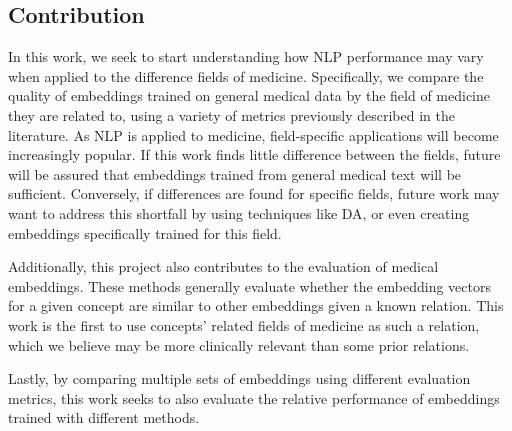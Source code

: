 \documentclass[10pt]{article}
\begin{document}
\subsection{Contribution}



In this work, we seek to start understanding how NLP performance may vary when applied to the difference fields of medicine. Specifically, we compare the quality of embeddings trained on general medical data by the field of medicine they are related to, using a variety of metrics previously described in the literature. As NLP is applied to medicine, field-specific applications will become increasingly popular. If this work finds little difference between the fields, future will be assured that embeddings trained from general medical text will be sufficient. Conversely, if differences are found for specific fields, future work may want to address this shortfall by using techniques like DA, or even creating embeddings specifically trained for this field. 

Additionally, this project also contributes to the evaluation of medical embeddings. These methods generally evaluate whether the embedding vectors for a given concept are similar to other embeddings given a known relation. This work is the first to use concepts' related fields of medicine as such a relation, which we believe may be more clinically relevant than some prior relations. 

Lastly, by comparing multiple sets of embeddings using different evaluation metrics, this work seeks to also evaluate the relative performance of embeddings trained with different methods. 

\end{document}
